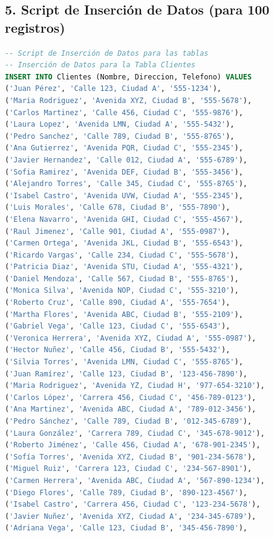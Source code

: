 \documentclass[12pt]{article}
\begin{document}
    \subsection*{5. Script de Inserción de Datos (para 100 registros)}
    \begin{lstlisting}[language=SQL]
-- Script de Inserción de Datos para las tablas 
-- Inserción de Datos para la Tabla Clientes
INSERT INTO Clientes (Nombre, Direccion, Telefono) VALUES
('Juan Pérez', 'Calle 123, Ciudad A', '555-1234'),
('Maria Rodriguez', 'Avenida XYZ, Ciudad B', '555-5678'),
('Carlos Martinez', 'Calle 456, Ciudad C', '555-9876'),
('Laura Lopez', 'Avenida LMN, Ciudad A', '555-5432'),
('Pedro Sanchez', 'Calle 789, Ciudad B', '555-8765'),
('Ana Gutierrez', 'Avenida PQR, Ciudad C', '555-2345'),
('Javier Hernandez', 'Calle 012, Ciudad A', '555-6789'),
('Sofia Ramirez', 'Avenida DEF, Ciudad B', '555-3456'),
('Alejandro Torres', 'Calle 345, Ciudad C', '555-8765'),
('Isabel Castro', 'Avenida UVW, Ciudad A', '555-2345'),
('Luis Morales', 'Calle 678, Ciudad B', '555-7890'),
('Elena Navarro', 'Avenida GHI, Ciudad C', '555-4567'),
('Raul Jimenez', 'Calle 901, Ciudad A', '555-0987'),
('Carmen Ortega', 'Avenida JKL, Ciudad B', '555-6543'),
('Ricardo Vargas', 'Calle 234, Ciudad C', '555-5678'),
('Patricia Diaz', 'Avenida STU, Ciudad A', '555-4321'),
('Daniel Mendoza', 'Calle 567, Ciudad B', '555-8765'),
('Monica Silva', 'Avenida NOP, Ciudad C', '555-3210'),
('Roberto Cruz', 'Calle 890, Ciudad A', '555-7654'),
('Martha Flores', 'Avenida ABC, Ciudad B', '555-2109'),
('Gabriel Vega', 'Calle 123, Ciudad C', '555-6543'),
('Veronica Herrera', 'Avenida XYZ, Ciudad A', '555-0987'),
('Hector Nuñez', 'Calle 456, Ciudad B', '555-5432'),
('Silvia Torres', 'Avenida LMN, Ciudad C', '555-8765'),
('Juan Ramírez', 'Calle 123, Ciudad B', '123-456-7890'),
('Maria Rodriguez', 'Avenida YZ, Ciudad H', '977-654-3210'),
('Carlos López', 'Carrera 456, Ciudad C', '456-789-0123'),
('Ana Martinez', 'Avenida ABC, Ciudad A', '789-012-3456'),
('Pedro Sánchez', 'Calle 789, Ciudad B', '012-345-6789'),
('Laura González', 'Carrera 789, Ciudad C', '345-678-9012'),
('Roberto Jiménez', 'Calle 456, Ciudad A', '678-901-2345'),
('Sofía Torres', 'Avenida XYZ, Ciudad B', '901-234-5678'),
('Miguel Ruiz', 'Carrera 123, Ciudad C', '234-567-8901'),
('Carmen Herrera', 'Avenida ABC, Ciudad A', '567-890-1234'),
('Diego Flores', 'Calle 789, Ciudad B', '890-123-4567'),
('Isabel Castro', 'Carrera 456, Ciudad C', '123-234-5678'),
('Javier Nuñez', 'Avenida XYZ, Ciudad A', '234-345-6789'),
('Adriana Vega', 'Calle 123, Ciudad B', '345-456-7890'),

\end{lstlisting}
\end{document}
